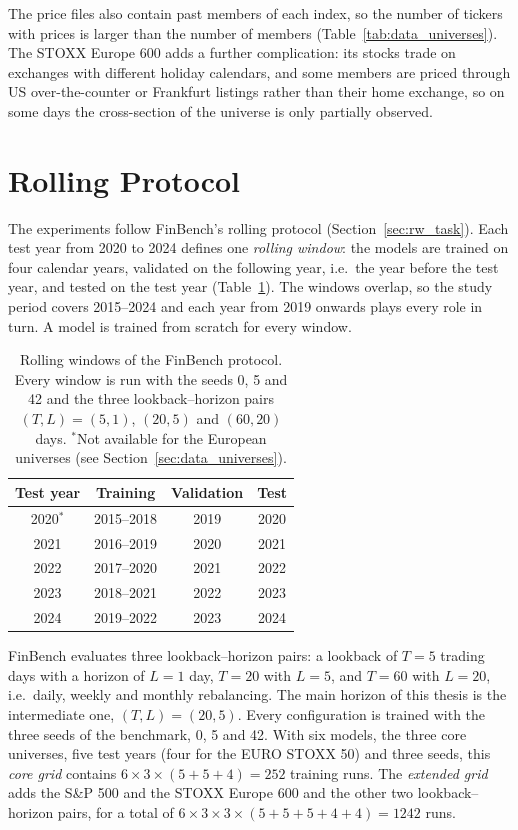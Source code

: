 The price files also contain past members of each index, so the number of tickers with prices is larger than the number of members (Table~\ref{tab:data_universes}). The STOXX Europe 600 adds a further complication: its stocks trade on exchanges with different holiday calendars, and some members are priced through US over-the-counter or Frankfurt listings rather than their home exchange, so on some days the cross-section of the universe is only partially observed.

\section{Rolling Protocol}
\label{sec:data_protocol}

The experiments follow FinBench's rolling protocol (Section~\ref{sec:rw_task}). Each test year from 2020 to 2024 defines one \emph{rolling window}: the models are trained on four calendar years, validated on the following year, i.e.\ the year before the test year, and tested on the test year (Table~\ref{tab:data_windows}). The windows overlap, so the study period covers 2015--2024 and each year from 2019 onwards plays every role in turn. A model is trained from scratch for every window.

\begin{table}[htbp]
    \centering
    \small
    \begin{tabular}{@{}cccc@{}}
        \toprule
        \textbf{Test year} & \textbf{Training} & \textbf{Validation} & \textbf{Test} \\
        \midrule
        2020$^\ast$ & 2015--2018 & 2019 & 2020 \\
        2021 & 2016--2019 & 2020 & 2021 \\
        2022 & 2017--2020 & 2021 & 2022 \\
        2023 & 2018--2021 & 2022 & 2023 \\
        2024 & 2019--2022 & 2023 & 2024 \\
        \bottomrule
    \end{tabular}
    \caption{Rolling windows of the FinBench protocol. Every window is run with the seeds 0, 5 and 42 and the three lookback--horizon pairs $(T, L) = (5, 1)$, $(20, 5)$ and $(60, 20)$ days. $^\ast$Not available for the European universes (see Section~\ref{sec:data_universes}).}
    \label{tab:data_windows}
\end{table}

FinBench evaluates three lookback--horizon pairs: a lookback of $T = 5$ trading days with a horizon of $L = 1$ day, $T = 20$ with $L = 5$, and $T = 60$ with $L = 20$, i.e.\ daily, weekly and monthly rebalancing. The main horizon of this thesis is the intermediate one, $(T, L) = (20, 5)$. Every configuration is trained with the three seeds of the benchmark, 0, 5 and 42. With six models, the three core universes, five test years (four for the EURO STOXX 50) and three seeds, this \emph{core grid} contains $6 \times 3 \times (5 + 5 + 4) = 252$ training runs. The \emph{extended grid} adds the S\&P 500 and the STOXX Europe 600 and the other two lookback--horizon pairs, for a total of $6 \times 3 \times 3 \times (5 + 5 + 5 + 4 + 4) = 1242$ runs.

